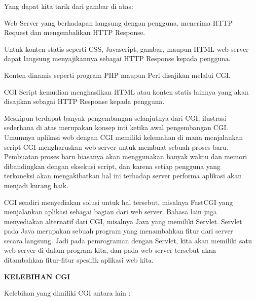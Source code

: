 \documentclass{wileySix}
\begin{document}


\vspace{12pt}
\vspace{12pt}
\noindent 
Yang dapat kita tarik dari gambar di atas: \par
\noindent 
\begin{myEnumerate}
	\item Web Server yang berhadapan langsung dengan pengguna, menerima HTTP Request dan mengembalikan HTTP Response. \par
	\noindent 
	\item Untuk konten statis seperti CSS, Javascript, gambar, maupun HTML web server dapat langsung menyajikannya sebagai HTTP Response kepada pengguna. \par
	\noindent 
	\item Konten dinamis seperti program PHP maupun Perl disajikan melalui CGI. \par
	\noindent 
	\item CGI Script kemudian menghasilkan HTML atau konten statis lainnya yang akan disajikan sebagai HTTP Response kepada pengguna.\end{myEnumerate}
\par
\vspace{12pt}
Meskipun terdapat banyak pengembangan selanjutnya dari CGI, ilustrasi sederhana di atas merupakan konsep inti ketika awal pengembangan CGI. Umumnya aplikasi web dengan CGI memiliki kelemahan di mana menjalankan script CGI mengharuskan web server untuk membuat sebuah proses baru. Pembuatan proses baru biasanya akan menggunakan banyak waktu dan memori dibandingkan dengan eksekusi script, dan karena setiap pengguna yang terkoneksi akan mengakibatkan hal ini terhadap server performa aplikasi akan menjadi kurang baik. \par
CGI sendiri menyediakan solusi untuk hal tersebut, misalnya FastCGI yang menjalankan aplikasi sebagai bagian dari web server. Bahasa lain juga menyediakan alternatif dari CGI, misalnya Java yang memiliki Servlet. Servlet pada Java merupakan sebuah program yang menambahkan fitur dari server secara langsung. Jadi pada pemrograman dengan Servlet, kita akan memiliki satu web server di dalam program kita, dan pada web server tersebut akan ditambahkan fitur-fitur spesifik aplikasi web kita. \par
\vspace{12pt}
\noindent 
\textbf{KELEBIHAN CGI} \par
\noindent 
Kelebihan yang dimiliki CGI antara lain :  \par
\end{document}

